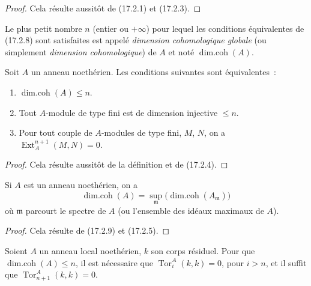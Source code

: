 \begin{proof}
Cela résulte aussitôt de (17.2.1) et (17.2.3).
\end{proof}

Le plus petit nombre $n$ (entier ou $+\infty$) pour lequel les conditions
équivalentes de (17.2.8) sont satisfaites est appelé \emph{dimension
cohomologique globale} (ou simplement \emph{dimension cohomologique}) de $A$
et noté $\operatorname{dim.coh}(A)$.

\begin{proposition}[17.2.9]
\label{0.17.2.9-fr}
Soit $A$ un anneau noethérien. Les conditions suivantes sont équivalentes~:
\begin{enumerate}
  \item[\rm a)] $\operatorname{dim.coh}(A)\leq n$.
  \item[\rm b)] Tout $A$-module de type fini est de dimension injective
  $\leq n$.
  \item[\rm c)] Pour tout couple de $A$-modules de type fini, $M$, $N$, on a
  $\operatorname{Ext}^{n+1}_A(M,N)=0$.
\end{enumerate}
\end{proposition}

\begin{proof}
Cela résulte aussitôt de la définition et de (17.2.4).
\end{proof}

\begin{corollary}[17.2.10]
\label{0.17.2.10-fr}
Si $A$ est un anneau noethérien, on a
\begin{equation}
\label{0.17.2.10.1-fr}
\tag{17.2.10.1}
  \operatorname{dim.coh}(A)
  =\sup_{\mathfrak{m}}
  \bigl(\operatorname{dim.coh}(A_{\mathfrak{m}})\bigr)
\end{equation}
où $\mathfrak{m}$ parcourt le spectre de $A$ \textup{(}ou l'ensemble des idéaux
maximaux de $A$\textup{)}.
\end{corollary}

\begin{proof}
Cela résulte de (17.2.9) et (17.2.5).
\end{proof}

\begin{proposition}[17.2.11]
\label{0.17.2.11-fr}
Soient $A$ un anneau local noethérien, $k$ son corps résiduel. Pour que
$\operatorname{dim.coh}(A)\leq n$, il est nécessaire que
$\operatorname{Tor}^A_i(k,k)=0$, pour $i>n$, et il suffit que
$\operatorname{Tor}^A_{n+1}(k,k)=0$.
\end{proposition}

